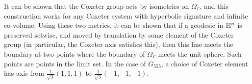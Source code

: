 It can be shown that the Coxeter group acts by isometries on $\Omega_\Gamma$, and this construction works for any Coxeter system with hyperbolic signature and infinite co-volume.
Using these two metrics, it can be shown that if a geodesic in $\mathbb{H}^n$ is preserved setwise, and moved by translation by some element of the Coxeter group (in particular, the Coxeter axis satisfies this), then this line meets the boundary at two points where the boundary of $\Omega_\Gamma$ meets the unit sphere.
Such points are points in the limit set.
In the case of $G_{555}$, a choice of Coxeter element has axis from  $\frac{1}{\sqrt{3}}(1,1,1)$ to $\frac{1}{\sqrt{3}}(-1,-1,-1)$.


